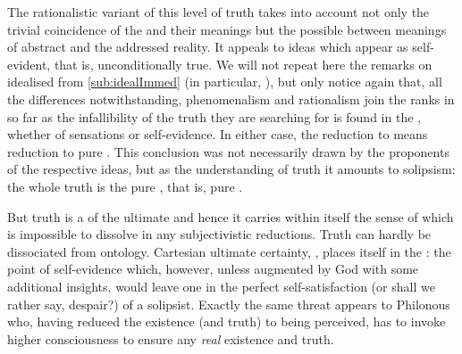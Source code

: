 The rationalistic variant of this level of truth takes into account not only the
trivial coincidence of the  and their meanings but the
possible  between meanings of abstract  and the addressed
reality. It appeals to  ideas which appear as self-evident, that
is, unconditionally true. We will not repeat here the remarks on idealised
 from \ref{sub:idealImmed} (in particular,
), but only notice again that, all the differences
notwithstanding, phenomenalism and rationalism join the ranks in so far as the
infallibility of the truth they are searching for is found in the
, whether of sensations or self-evidence.
In either case, the reduction
to  means reduction to pure . This conclusion was not
necessarily drawn by the proponents of the respective ideas, but as the
understanding of truth it amounts to solipsism:  the whole truth is the pure
, that is, pure .

\pa But truth is a  of the ultimate   and hence it carries within
itself the 
sense of  which is impossible to dissolve in any
subjectivistic reductions. Truth can hardly be dissociated from ontology.
Cartesian ultimate certainty, , places itself in the
: the point of self-evidence which, however, unless
augmented by God with some additional insights, would leave one in the perfect
self-satisfaction (or shall we rather say, despair?) of a solipsist. Exactly the
same threat appears to Philonous who, having reduced the existence (and truth)
to being  perceived, has to invoke higher consciousness to
ensure any {\em real} existence and truth.

